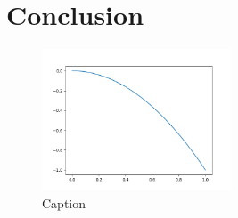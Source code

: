 \section{Conclusion}

\begin{figure}
    \centering
    \includegraphics[width=0.5\textwidth]{Bilder/oppg1.png}
    \caption[Caption used in list of tables]{Caption}
    \label{fig:test}
\end{figure}